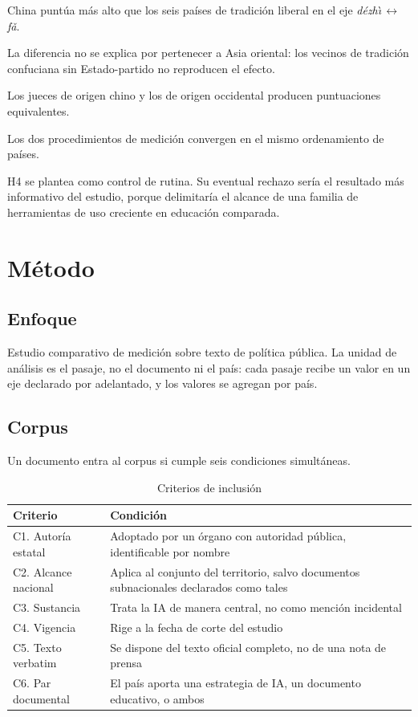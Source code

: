 \documentclass[12pt,letterpaper]{article}
\newcommand{\dezhi}{\textit{d\'ezh\`{\i}}}
\newcommand{\fa}{\textit{f\v{a}}}
\newcommand{\ejedf}{\dezhi\,$\leftrightarrow$\,\fa}
\begin{document}
\begin{description}[leftmargin=1.4cm,style=nextline]
  \item[H1.] China puntúa más alto que los seis países de tradición liberal en el eje \ejedf.
  \item[H2.] La diferencia no se explica por pertenecer a Asia oriental: los vecinos de tradición confuciana sin Estado-partido no reproducen el efecto.
  \item[H3.] Los jueces de origen chino y los de origen occidental producen puntuaciones equivalentes.
  \item[H4.] Los dos procedimientos de medición convergen en el mismo ordenamiento de países.
\end{description}

H4 se plantea como control de rutina. Su eventual rechazo sería el resultado más informativo del estudio, porque delimitaría el alcance de una familia de herramientas de uso creciente en educación comparada.


\section{Método}

\subsection{Enfoque}

Estudio comparativo de medición sobre texto de política pública. La unidad de análisis es el pasaje, no el documento ni el país: cada pasaje recibe un valor en un eje declarado por adelantado, y los valores se agregan por país.

\subsection{Corpus}

Un documento entra al corpus si cumple seis condiciones simultáneas.

\begin{table}[htbp]
\centering
\small
\caption{Criterios de inclusión}
\begin{tabular}{@{}lp{10.5cm}@{}}
\toprule
\textbf{Criterio} & \textbf{Condición} \\
\midrule
C1. Autoría estatal   & Adoptado por un órgano con autoridad pública, identificable por nombre \\
C2. Alcance nacional  & Aplica al conjunto del territorio, salvo documentos subnacionales declarados como tales \\
C3. Sustancia         & Trata la IA de manera central, no como mención incidental \\
C4. Vigencia          & Rige a la fecha de corte del estudio \\
C5. Texto verbatim    & Se dispone del texto oficial completo, no de una nota de prensa \\
C6. Par documental    & El país aporta una estrategia de IA, un documento educativo, o ambos \\
\bottomrule
\end{tabular}
\end{table}
\end{document}
